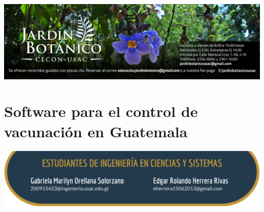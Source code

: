 \documentclass[12pt,spanish,Letterpaper,openany]{book}
\begin{document}
\begin{center}\includegraphics[width=1\linewidth]{images/publicidad10} \end{center}

\hypertarget{pareja22}{%
\chapter{Software para el control de vacunación en Guatemala}\label{pareja22}}

\begin{center}\includegraphics[width=1\linewidth]{images/pareja22_image1} \end{center}
\end{document}
